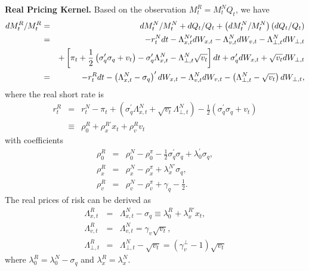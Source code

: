 \documentclass{article}
\begin{document}
\textbf{Real Pricing Kernel.} Based on the observation $%
M_{t}^{R}=M_{t}^{N}Q_{t}$, we have%
\begin{eqnarray*}
dM_{t}^{R}/M_{t}^{R} &=&dM_{t}^{N}/M_{t}^{N}+dQ_{t}/Q_{t}+\left(
dM_{t}^{N}/M_{t}^{N}\right) \left( dQ_{t}/Q_{t}\right)  \\
&=&-r_{t}^{N}dt-\Lambda _{x,t}^{N\prime }dW_{x,t}-\Lambda
_{v,t}^{N}dW_{v,t}-\Lambda _{\bot ,t}^{N}dW_{\bot ,t} \\
&&+\left[ \pi _{t}+\frac{1}{2}\left( \sigma _{q}^{\prime }\sigma
_{q}+v_{t}\right) -\sigma _{q}^{\prime }\Lambda _{x,t}^{N}-\Lambda _{\bot
,t}^{N}\sqrt{v_{t}}\right] dt+\sigma _{q}^{\prime }dW_{x,t}+\sqrt{v_{t}}%
dW_{\bot ,t} \\
&=&-r_{t}^{R}dt-\left( \Lambda _{x,t}^{N}-\sigma _{q}\right) ^{\prime
}dW_{x,t}-\Lambda _{v,t}^{N}dW_{v,t}-\left( \Lambda _{\bot ,t}^{N}-\sqrt{%
v_{t}}\right) dW_{\bot ,t},
\end{eqnarray*}%
where the real short rate is 
\begin{eqnarray*}
r_{t}^{R} &=&r_{t}^{N}-\pi _{t}+\left( \sigma _{q}^{\prime }\Lambda
_{x,t}^{N}+\sqrt{v_{t}}\Lambda _{\bot ,t}^{N}\right) -\frac{1}{2}\left(
\sigma _{q}^{\prime }\sigma _{q}+v_{t}\right)  \\
&\equiv &\rho _{0}^{R}+\rho _{x}^{R\prime }x_{t}+\rho _{v}^{R}v_{t}
\end{eqnarray*}%
with coefficients 
\begin{eqnarray*}
\rho _{0}^{R} &=&\rho _{0}^{N}-\rho _{0}^{\pi }-\frac{1}{2}\sigma
_{q}^{\prime }\sigma _{q}+\lambda _{0}^{\prime }\sigma _{q}, \\
\rho _{x}^{R} &=&\rho _{x}^{N}-\rho _{x}^{\pi }+\lambda _{x}^{N\prime
}\sigma _{q}, \\
\rho _{v}^{R} &=&\rho _{v}^{N}-\rho _{v}^{\pi }+\gamma _{q}-\frac{1}{2}.
\end{eqnarray*}
The real prices of risk can be derived as%
\begin{eqnarray*}
\Lambda _{x,t}^{R} &=&\Lambda _{x,t}^{N}-\sigma _{q}\equiv \lambda
_{0}^{R}+\lambda _{x}^{R\prime }x_{t}, \\
\Lambda _{v,t}^{R} &=&\Lambda _{v,t}^{N}=\gamma _{v}\sqrt{v_{t}}, \\
\Lambda _{\bot ,t}^{R} &=&\Lambda _{\bot ,t}^{N}-\sqrt{v_{t}}=\left( \gamma
_{v}^{\bot }-1\right) \sqrt{v_{t}}
\end{eqnarray*}%
where $\lambda _{0}^{R}=\lambda _{0}^{N}-\sigma _{q}$ and $\lambda
_{x}^{R}=\lambda _{x}^{N}${}.
\end{document}
